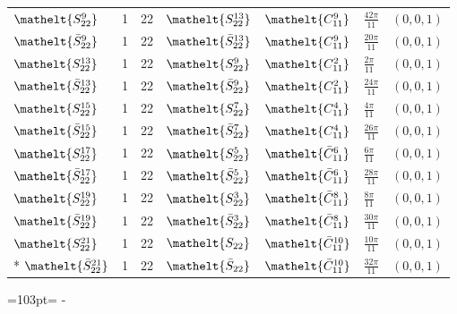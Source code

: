 \documentclass[10pt,a4paper]{article}
\newcommand{\needspace}[1]{\par\penalty-100\begingroup\dimen0=#1\relax\dimen2=\pagegoal
  \advance\dimen2-\pagetotal\ifdim\dimen0>\dimen2\relax\ifdim\dimen2>0pt\vfil\break\fi\fi
  \endgroup}
\numberwithin{equation}{section}
\newcommand{\eltfont}[1]{{\let\sigma\eltsigma\mathelt{#1}}}
\newcommand{\cls}[1]{\eltfont{#1}}
\newcommand{\dirvec}[3]{(#1, #2, #3)}
\newcommand{\barred}[1]{\bar{#1}}
\begin{document}
{\begin{longtable}{@{}lrrllll@{}}
$\cls{S_{22}^{9}}$ & 1 & 22 & $\cls{S_{22}^{13}}$ & $\cls{C_{11}^{9}}$ & $\tfrac{42\pi}{11}$ & $\dirvec{0}{0}{1}$\\
$\cls{\barred{S}_{22}^{9}}$ & 1 & 22 & $\cls{\barred{S}_{22}^{13}}$ & $\cls{C_{11}^{9}}$ & $\tfrac{20\pi}{11}$ & $\dirvec{0}{0}{1}$\\
$\cls{S_{22}^{13}}$ & 1 & 22 & $\cls{S_{22}^{9}}$ & $\cls{C_{11}^{2}}$ & $\tfrac{2\pi}{11}$ & $\dirvec{0}{0}{1}$\\
$\cls{\barred{S}_{22}^{13}}$ & 1 & 22 & $\cls{\barred{S}_{22}^{9}}$ & $\cls{C_{11}^{2}}$ & $\tfrac{24\pi}{11}$ & $\dirvec{0}{0}{1}$\\
$\cls{S_{22}^{15}}$ & 1 & 22 & $\cls{S_{22}^{7}}$ & $\cls{C_{11}^{4}}$ & $\tfrac{4\pi}{11}$ & $\dirvec{0}{0}{1}$\\
$\cls{\barred{S}_{22}^{15}}$ & 1 & 22 & $\cls{\barred{S}_{22}^{7}}$ & $\cls{C_{11}^{4}}$ & $\tfrac{26\pi}{11}$ & $\dirvec{0}{0}{1}$\\
$\cls{S_{22}^{17}}$ & 1 & 22 & $\cls{S_{22}^{5}}$ & $\cls{\barred{C}_{11}^{6}}$ & $\tfrac{6\pi}{11}$ & $\dirvec{0}{0}{1}$\\
$\cls{\barred{S}_{22}^{17}}$ & 1 & 22 & $\cls{\barred{S}_{22}^{5}}$ & $\cls{\barred{C}_{11}^{6}}$ & $\tfrac{28\pi}{11}$ & $\dirvec{0}{0}{1}$\\
$\cls{S_{22}^{19}}$ & 1 & 22 & $\cls{S_{22}^{3}}$ & $\cls{\barred{C}_{11}^{8}}$ & $\tfrac{8\pi}{11}$ & $\dirvec{0}{0}{1}$\\
$\cls{\barred{S}_{22}^{19}}$ & 1 & 22 & $\cls{\barred{S}_{22}^{3}}$ & $\cls{\barred{C}_{11}^{8}}$ & $\tfrac{30\pi}{11}$ & $\dirvec{0}{0}{1}$\\
$\cls{S_{22}^{21}}$ & 1 & 22 & $\cls{S_{22}}$ & $\cls{\barred{C}_{11}^{10}}$ & $\tfrac{10\pi}{11}$ & $\dirvec{0}{0}{1}$\\*
$\cls{\barred{S}_{22}^{21}}$ & 1 & 22 & $\cls{\barred{S}_{22}}$ & $\cls{\barred{C}_{11}^{10}}$ & $\tfrac{32\pi}{11}$ & $\dirvec{0}{0}{1}$\\
\bottomrule\end{longtable}}
\needspace{103pt}
\end{document}
